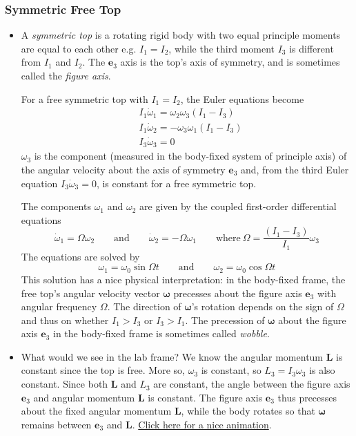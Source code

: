 \documentclass[11pt, a4paper]{article}
\newcommand{\eqtext}[1]{\qquad \text{#1} \qquad}
\newcommand{\e}{\mathbf{e}} %
\begin{document}
\subsubsection{Symmetric Free Top}
\begin{itemize}
	\item A \textit{symmetric top} is a rotating rigid body with two equal principle moments are equal to each other e.g. $ I_{1} = I_{2}$, while the third moment $ I_{3} $ is different from $ I_{1} $ and $ I_{2} $. The $ \e_{3} $ axis is the top's axis of symmetry, and is sometimes called the \textit{figure axis}.
	
	For a free symmetric top with $ I_{1} = I_{2} $, the Euler equations become
	\begin{align*}
		&I_{1}\dot {\omega }_{1}  = \omega_{2}\omega_{3} (I_{1}-I_{3})\\
		&I_{1}\dot  {\omega }_{2}  = - \omega_{3}\omega_{1} (I_{1}-I_{3})\\
		&I_{3}\dot{\omega}_{3} = 0
	\end{align*}
	$ \omega_{3} $ is the component (measured in the body-fixed system of principle axis) of the angular velocity  about the axis of symmetry $ \e_{3} $ and, from the third Euler equation $ I_{3} \dot{\omega}_{3} = 0$, is constant for a free symmetric top.
	
	The components $ \omega_{1} $ and $ \omega_{2} $ are given by the coupled first-order differential equations
	\begin{equation*}
		\dot \omega_{1} = \Omega\omega_{2} \eqtext{and} \dot \omega_{2} = - \Omega \omega_{1} \qquad \text{where} \ \Omega = \frac{(I_{1} - I_{3})}{I_{1}} \omega_{3}
	\end{equation*}
	The equations are solved by 
	\begin{equation*}
		\omega_{1} = \omega_{0}\sin \Omega t \eqtext{and} \omega_{2} = \omega_{0}\cos \Omega t
	\end{equation*}
	This solution has a nice physical interpretation: in the body-fixed frame, the free top's angular velocity vector $ \bm{\omega} $ precesses about the figure axis $ \e_{3} $ with angular frequency $ \Omega $. The direction of $ \bm{\omega} $'s rotation depends on the sign of $ \Omega $ and thus on whether $ I_1 > I_{3} $ or $ I_{3} > I_{1} $. The precession of $ \bm{\omega} $ about the figure axis $ \e_{3} $ in the body-fixed frame is sometimes called \textit{wobble}.
	
	\item What would we see in the lab frame? We know the angular momentum $ \bm{L} $ is constant since the top is free. More so, $ \omega_{3} $ is constant, so $ L_{3} = I_{3} \omega_{3} $ is also constant. Since both $ \bm{L} $ and $ L_{3} $ are constant, the angle between the figure axis $ \e_{3} $ and angular momentum $ \bm{L} $ is constant. The figure axis $ \e_{3} $ thus precesses about the fixed angular momentum $ \bm{L} $, while the body rotates so that $ \bm{\omega} $ remains between $ \e_{3} $ and $ \bm{L} $. \href{https://www.youtube.com/watch?v=s9wiRjUKctU} {Click here for a nice animation}.
	
\end{itemize}
\end{document}
